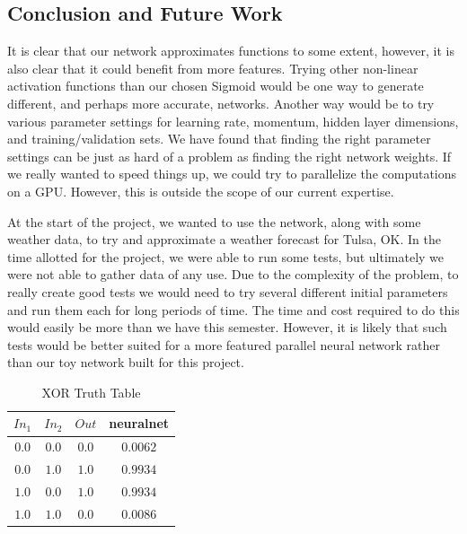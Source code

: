 \documentclass{article}
\begin{document}
\begin{multicols}{2}
\section{Conclusion and Future Work}

It is clear that our network approximates functions to some extent, however, it is also clear that it could benefit from more features. Trying other non-linear activation functions than our chosen Sigmoid would be one way to generate different, and perhaps more accurate, networks. Another way would be to try various parameter settings for learning rate, momentum, hidden layer dimensions, and training/validation sets. We have found that finding the right parameter settings can be just as hard of a problem as finding the right network weights. If we really wanted to speed things up, we could try to parallelize the computations on a GPU. However, this is outside the scope of our current expertise.

At the start of the project, we wanted to use the network, along with some weather data, to try and approximate a weather forecast for Tulsa, OK. In the time allotted for the project, we were able to run some tests, but ultimately we were not able to gather data of any use. Due to the complexity of the problem, to really create good tests we would need to try several different initial parameters and run them each for long periods of time. The time and cost required to do this would easily be more than we have this semester. However, it is likely that such tests would be better suited for a more featured parallel neural network rather than our toy network built for this project.




\end{multicols}

\pagebreak

\begin{table}[ht]
	\caption{XOR Truth Table}
	\label{tab:xortable}
	\begin{center}
		\begin{tabular}{cc|cc}
		\hline
		\hline
		\textbf{$In_1$} & \textbf{$In_2$} & \textbf{$Out$} & neuralnet \\
		\hline
			$0.0$ & $0.0$ & $0.0$ & $0.0062$\\
			$0.0$ & $1.0$ & $1.0$ & $0.9934$\\
			$1.0$ & $0.0$ & $1.0$ & $0.9934$\\
			$1.0$ & $1.0$ & $0.0$ & $0.0086$\\
		\hline

		\hline
		\end{tabular}
	\end{center}
\end{table}
\end{document}
